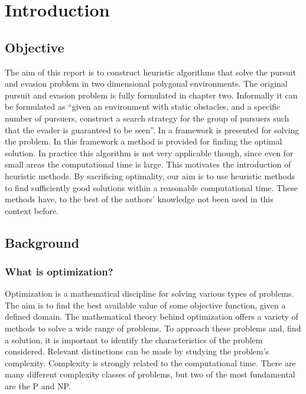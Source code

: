 \chapter{Introduction}

\section{Objective}

The aim of this report is to construct heuristic algorithms that solve the pursuit and evasion problem in two dimensional polygonal environments. The original pursuit and evasion problem is fully formulated in chapter two. Informally it can be formulated as ``given an environment with static obstacles, and a specific number of pursuers, construct a search strategy for the group of pursuers such that the evader is guaranteed to be seen''. In \cite{paper3} a framework is presented for solving the problem. In this framework a method is provided for finding the optimal solution. In practice this algorithm is not very applicable though, since even for small areas the computational time is large. This motivates the introduction of heuristic methods. By sacrificing optimality, our aim is to use heuristic methods to find sufficiently good solutions within a reasonable computational time. These methods have, to the best of the authors' knowledge not been used in this context before.
\section{Background}

\subsection{What is optimization?}
Optimization is a mathematical discipline for solving various types of problems. The aim is to find the best available value of some objective function, given a defined domain.%
The mathematical theory behind optimization offers a variety of methods to solve a wide range of problems. To approach these problems and, find a solution, it is important to identify the characteristics of the problem considered. Relevant distinctions can be made by studying the problem's complexity. Complexity is strongly related to the computational time. There are many different complexity classes of problems, but two of the most fundamental are the P and NP.

